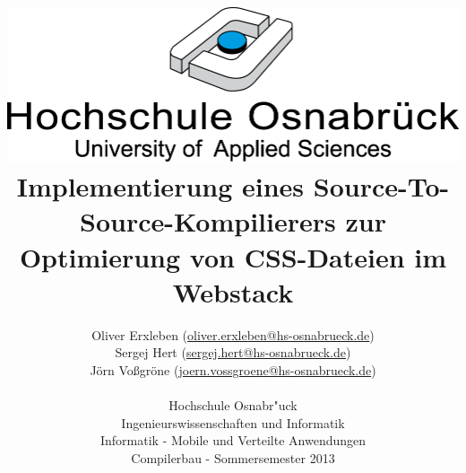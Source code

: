 \documentclass[11pt]{scrartcl}
\begin{document}
\author{%
	Oliver Erxleben \small(\href{mailto:oliver.erxleben@hs-osnabrueck.de}{oliver.erxleben@hs-osnabrueck.de})\\%
	Sergej Hert \small(\href{mailto:sergej.hert@hs-osnabrueck.de}{sergej.hert@hs-osnabrueck.de})\\%
	Jörn Voßgröne \small(\href{mailto:joern.vossgroene@hs-osnabrueck.de}{joern.vossgroene@hs-osnabrueck.de})\\
	\\%
	Hochschule Osnabr"uck \\%
	Ingenieurswissenschaften und Informatik \\%
	Informatik - Mobile und Verteilte Anwendungen\\
	Compilerbau - Sommersemester 2013 }

\title{\includegraphics[scale=0.75,keepaspectratio]{img/hs_os.png}\linebreak \linebreak Implementierung eines Source-To-Source-Kompilierers zur Optimierung von CSS-Dateien im Webstack}

\maketitle
\thispagestyle{empty}
\tableofcontents
\listoffigures

\lstlistoflistings
\thispagestyle{empty}
\pagebreak
\thispagestyle{empty}
\end{document}
